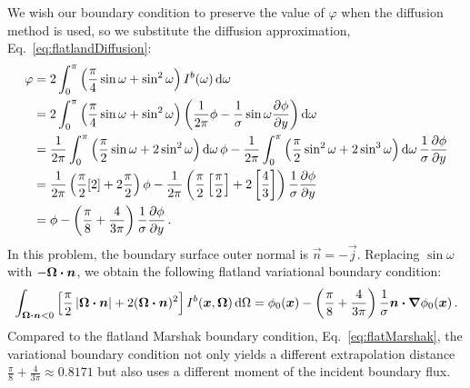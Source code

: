 We wish our boundary condition to preserve the value of
$\varphi$ when the diffusion method is used, so we substitute the diffusion
approximation, Eq.~\eqref{eq:flatlandDiffusion}:
\begin{align*}
 \varphi &= 2\int_{0}^{\pi} \left( \frac{\pi}{4} \sin\omega + \sin^2\omega \right)
 I^b(\omega) \mathop{}\!\mathrm{d}\omega
 \\
 &= 
  2\int_{0}^{\pi} \left( \frac{\pi}{4} \sin\omega + \sin^2\omega \right)
 \left( \frac{1}{2\pi} \phi -
  \frac{1}{\sigma} \sin\omega \frac{\partial \phi}{\partial y}\right)\mathop{}\!\mathrm{d}\omega
\\
 &= 
\frac{1}{2\pi} \int_{0}^{\pi} \left( \frac{\pi}{2} \sin\omega + 2 \sin^2\omega
\right)\mathop{}\!\mathrm{d}\omega
 \,\phi -
 \frac{1}{2\pi} \int_{0}^{\pi} \left( \frac{\pi}{2} \sin^2\omega + 2 \sin^3\omega \right)\mathop{}\!\mathrm{d}\omega
  \,\frac{1}{\sigma} \frac{\partial \phi}{\partial y}
  \\
 &= 
 \frac{1}{2\pi} \left( \frac{\pi}{2} [2] + 2 \frac{\pi}{2}
\right) \phi
-
\frac{1}{2\pi} \left( \frac{\pi}{2} \left[ \frac{\pi}{2} \right] + 2 \left[
\frac{4}{3} \right] \right) \frac{1}{\sigma} \frac{\partial \phi}{\partial y}
\\
 &= 
  \phi
- \left( \frac{\pi}{8} + \frac{4}{3\pi} \right) \frac{1}{\sigma} \frac{\partial \phi}{\partial y}
\,.
\end{align*}
In this problem, the boundary surface outer normal is $\vec{n}=-\vec{j}$. 
Replacing $\sin \omega$ with $-\bm{\Omega}\bm{\cdot}\bm{n}$, we obtain the following
flatland variational boundary condition:
\begin{equation} \label{eq:flatVarBc}
\int_{\bm{\Omega}\bm{\cdot}\bm{n} < 0} \left[ \frac{\pi}{2}
\left| \bm{\Omega}\bm{\cdot}\bm{n} \right| + 2 (\bm{\Omega}\bm{\cdot}\bm{n})^2 \right]
I^b(\bm{x}, \bm{\Omega}) \mathop{}\!\mathrm{d}\Omega
= 
  \phi_0(\bm{x})
  - \left( \frac{\pi}{8} + \frac{4}{3\pi} \right) \frac{1}{\sigma}
  \bm{n}\bm{\cdot}\bm{\nabla} \phi_0(\bm{x})\,.
\end{equation}
Compared to the flatland Marshak boundary condition,
Eq.~\eqref{eq:flatMarshak}, the variational boundary condition not only yields a
different extrapolation distance $\frac{\pi}{8} + \frac{4}{3\pi} \approx
0.8171$ but also uses a different moment of the incident boundary flux.


